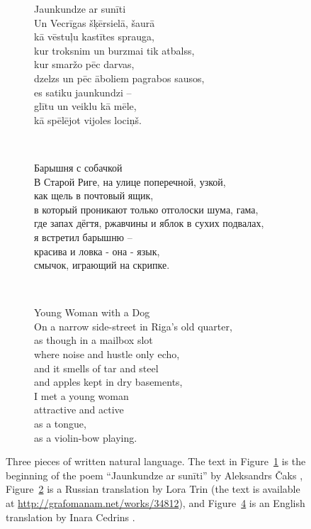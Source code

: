 \begin{figure}[t]
\tiny
\begin{subfigure}[t]{0.30\textwidth}
  Jaunkundze ar sunīti \\

  Un Vecrīgas šķērsielā, šaurā \\
  kā vēstuļu kastītes sprauga, \\
  kur troksnim un burzmai tik atbalss, \\
  kur smaržo pēc darvas, \\ ${}$\qquad dzelzs un pēc āboliem pagrabos sausos, \\
  es satiku jaunkundzi -- \\
  glītu un veiklu kā mēle, \\
  kā spēlējot vijoles lociņš.
  \vspace{0.74cm}
  \caption{}
  \label{fig:lv}
\end{subfigure}
~
\begin{subfigure}[t]{0.36\textwidth}
  Барышня с собачкой \\

  В Старой Риге, на улице поперечной, узкой, \\
  как щель в почтовый ящик, \\
  в который проникают только отголоски шума, гама, \\
  где запах дёгтя, ржавчины и яблок в сухих  подвалах, \\
  я встретил барышню -- \\
  красива и ловка - она - язык, \\
  смычок, играющий на скрипке.
  \vspace{0.99cm}
  \caption{}
  \label{fig:ru}
\end{subfigure}
~
\begin{subfigure}[t]{0.26\textwidth}
  Young Woman with a Dog \\

  On a narrow side-street in Riga’s old quarter, \\
  as though in a mailbox slot \\
  where noise and hustle only echo, \\
  and it smells of tar and steel \\
  and apples kept in dry basements, \\

  I met a young woman \\
  attractive and active \\
  as a tongue, \\
  as a violin-bow playing.
  \vspace{0.22cm}
  \caption{}
  \label{fig:en}
\end{subfigure}
\caption[Three pieces of written natural language]{Three pieces of written natural language. The text in
  Figure~\ref{fig:lv} is the beginning of the poem ``Jaunkundze ar sunīti'' by
  Aleksandrs Čaks \citeyearpar{čaks1996dzejas}, Figure~\ref{fig:ru} is a Russian
  translation by Lora Trin (the text is available at \url{http://grafomanam.net/works/34812}),
  and Figure~\ref{fig:en} is an English translation by Inara Cedrins \citeyearpar{cedrins}.}
\end{figure}
